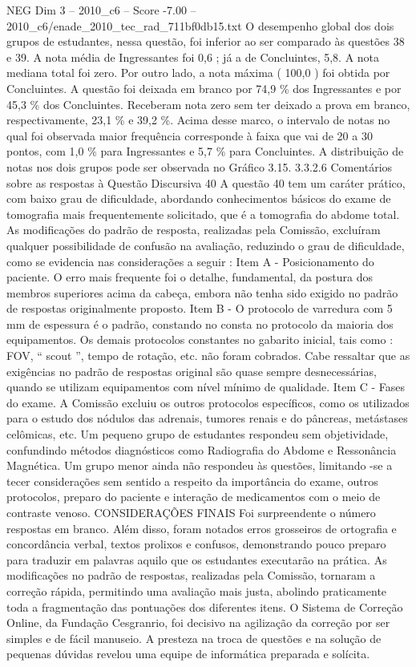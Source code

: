 \begin{textsample}{NEG Dim 3 – 2010\_c6 – Score -7.00 – 2010\_c6/enade\_2010\_tec\_rad\_711bf0db15.txt}
O desempenho global dos dois grupos de estudantes, nessa questão, foi inferior ao ser comparado às questões 38 e 39.
A nota média de Ingressantes foi 0,6 ; já a de Concluintes, 5,8.
A nota mediana total foi zero.
Por outro lado, a nota máxima ( 100,0 ) foi obtida por Concluintes.
A questão foi deixada em branco por 74,9 \% dos Ingressantes e por 45,3 \% dos Concluintes.
Receberam nota zero sem ter deixado a prova em branco, respectivamente, 23,1 \% e 39,2 \%.
Acima desse marco, o intervalo de notas no qual foi observada maior frequência corresponde à faixa que vai de 20 a 30 pontos, com 1,0 \% para Ingressantes e 5,7 \% para Concluintes.
A distribuição de notas nos dois grupos pode ser observada no Gráfico 3.15. 3.3.2.6 Comentários sobre as respostas à Questão Discursiva 40 A questão 40 tem um caráter prático, com baixo grau de dificuldade, abordando conhecimentos básicos do exame de tomografia mais frequentemente solicitado, que é a tomografia do abdome total.
As modificações do padrão de resposta, realizadas pela Comissão, excluíram qualquer possibilidade de confusão na avaliação, reduzindo o grau de dificuldade, como se evidencia nas considerações a seguir : Item A - Posicionamento do paciente.
O erro mais frequente foi o detalhe, fundamental, da postura dos membros superiores acima da cabeça, embora não tenha sido exigido no padrão de respostas originalmente proposto.
Item B - O protocolo de varredura com 5 mm de espessura é o padrão, constando no consta no protocolo da maioria dos equipamentos.
Os demais protocolos constantes no gabarito inicial, tais como : FOV, “ scout ”, tempo de rotação, etc. não foram cobrados.
Cabe ressaltar que as exigências no padrão de respostas original são quase sempre desnecessárias, quando se utilizam equipamentos com nível mínimo de qualidade.
Item C - Fases do exame.
A Comissão excluiu os outros protocolos específicos, como os utilizados para o estudo dos nódulos das adrenais, tumores renais e do pâncreas, metástases celômicas, etc.
Um pequeno grupo de estudantes respondeu sem objetividade, confundindo métodos diagnósticos como Radiografia do Abdome e Ressonância Magnética.
Um grupo menor ainda não respondeu às questões, limitando -se a tecer considerações sem sentido a respeito da importância do exame, outros protocolos, preparo do paciente e interação de medicamentos com o meio de contraste venoso.
CONSIDERAÇÕES FINAIS Foi surpreendente o número respostas em branco.
Além disso, foram notados erros grosseiros de ortografia e concordância verbal, textos prolixos e confusos, demonstrando pouco preparo para traduzir em palavras aquilo que os estudantes executarão na prática.
As modificações no padrão de respostas, realizadas pela Comissão, tornaram a correção rápida, permitindo uma avaliação mais justa, abolindo praticamente toda a fragmentação das pontuações dos diferentes itens.
O Sistema de Correção Online, da Fundação Cesgranrio, foi decisivo na agilização da correção por ser simples e de fácil manuseio.
A presteza na troca de questões e na solução de pequenas dúvidas revelou uma equipe de informática preparada e solícita.

\end{textsample}
